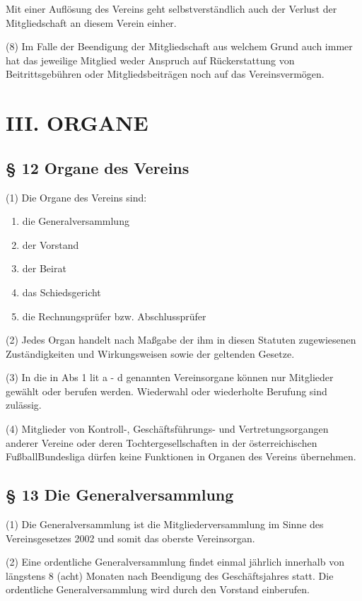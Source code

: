 \documentclass[11pt,a4paper]{article}
\begin{document}
Mit einer Auflösung des Vereins geht selbstverständlich auch der Verlust der Mitgliedschaft an diesem Verein einher.

(8)
Im Falle der Beendigung der Mitgliedschaft aus welchem Grund auch immer hat das jeweilige Mitglied weder Anspruch auf Rückerstattung von Beitrittsgebühren oder Mitgliedsbeiträgen noch auf das Vereinsvermögen.

\section{III. ORGANE}

\subsection{§ 12
Organe des Vereins}

(1)
Die Organe des Vereins sind:

\begin{enumerate}[label=\alph*)]
\item
die Generalversammlung
\item
der Vorstand
\item
der Beirat
\item
das Schiedsgericht
\item
die Rechnungsprüfer bzw. Abschlussprüfer
\end{enumerate}

(2)
Jedes Organ handelt nach Maßgabe der ihm in diesen Statuten zugewiesenen Zuständigkeiten und Wirkungsweisen sowie der geltenden Gesetze.

(3)
In die in Abs 1 lit a - d genannten Vereinsorgane können nur Mitglieder gewählt oder berufen werden.
Wiederwahl oder wiederholte Berufung sind zulässig.

(4)
Mitglieder von Kontroll-, Geschäftsführungs- und Vertretungsorgangen anderer Vereine oder deren Tochtergesellschaften in der österreichischen FußballBundesliga dürfen keine Funktionen in Organen des Vereins übernehmen.

\subsection{§ 13
Die Generalversammlung}

(1)
Die Generalversammlung ist die Mitgliederversammlung im Sinne des Vereinsgesetzes 2002 und somit das oberste Vereinsorgan.

(2)
Eine ordentliche Generalversammlung findet einmal jährlich innerhalb von längstens 8 (acht) Monaten nach Beendigung des Geschäftsjahres statt.
Die ordentliche Generalversammlung wird durch den Vorstand einberufen.
\end{document}
